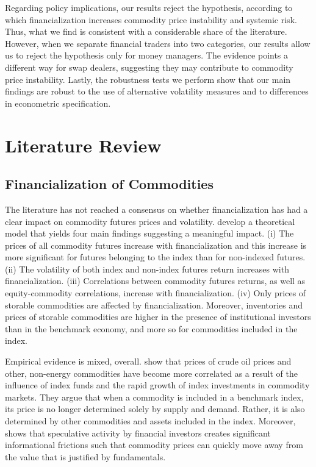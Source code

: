 \documentclass[12pt]{article}
\begin{document}
Regarding policy implications, our results reject the \citet{masters2009testimony} hypothesis, according to which  financialization increases commodity price instability and systemic risk. Thus, what we find is consistent with a considerable share of the literature. However, when we separate financial traders into two categories, our results allow us to reject  the \citet{masters2009testimony} hypothesis only for money managers. The evidence points a different way for swap dealers, suggesting they may contribute to commodity price instability. Lastly, the robustness tests we perform show that our main findings are robust to the use of alternative volatility measures and to differences in econometric specification.


\section{Literature Review}

\subsection{Financialization of Commodities}

The literature has not reached a consensus on whether financialization has had a clear impact on commodity futures prices and volatility. \citet{basak2016model} develop a theoretical model that yields four main findings suggesting a meaningful impact. (i) The prices of all commodity futures increase with financialization and this increase is more significant for futures belonging to the index than for non-indexed futures. (ii) The volatility of both index and non-index futures return increases with financialization. (iii) Correlations between commodity futures returns, as well as equity-commodity correlations, increase with financialization. (iv) Only prices of storable commodities are affected by financialization. Moreover, inventories and prices of storable commodities are higher in the presence of institutional investors than in the benchmark economy, and more so for commodities included in the index.


 Empirical evidence is mixed, overall. \citet{tang2012index} show that prices of crude oil prices and other, non-energy commodities have become more correlated as a result of the influence of index funds and the rapid growth of index investments in commodity markets. They argue that when a commodity is included in a benchmark index, its price is no longer determined solely by supply and demand. Rather, it is also determined by other commodities and assets included in the index. Moreover, \citet{singleton2014investor} shows that speculative activity by financial investors creates significant informational frictions such that commodity prices can quickly move away from the value that is justified by fundamentals. 
\end{document}
